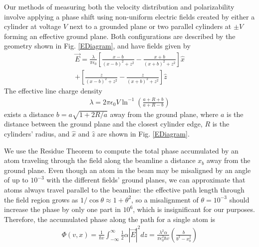 \documentclass[twocolumn,prl,showpacs,superscriptaddress]{revtex4-1}   %
\newcommand{\figref}[1]{Fig. \ref{#1}}
\begin{document}
Our methods of measuring both the velocity distribution and polarizability involve applying a phase shift using non-uniform electric fields created by either a cylinder at voltage $V$ next to a grounded plane or two parallel cylinders at $\pm V$ forming an effective ground plane. 
Both configurations are described by the geometry shown in \figref{EDiagram}, and have fields given by
\begin{align}
	\vec{E} = \frac{\lambda}{\pi\epsilon_0}
	\left[	
		\frac{x-b}{(x-b)^2+z^2} - \frac{x+b}{(x+b)^2+z^2}
	\right] \hat{x} \nonumber \\
	+ 
	\left[	
		\frac{z}{(x-b)^2+z^2} - \frac{z}{(x+b)^2+z^2}
	\right] \hat{z}
	\label{EPillars}
\end{align}
The effective line charge density
\begin{align}
	\lambda = 2\pi\epsilon_0V\ln^{-1}
	\left(
		\frac{a+R+b}{a+R-b}
	\right)
	\label{lambda}
\end{align}
exists a distance $b = a\sqrt{1+2R/a}$ away from the ground plane, where $a$ is the distance between the ground plane and the closest cylinder edge, $R$ is the cylinders' radius, and $\hat{x}$ and $\hat{z}$ are shown in \figref{EDiagram}.

We use the Residue Theorem to compute the total phase accumulated by an atom traveling through the field along the beamline a distance $x_b$ away from the ground plane. Even though an atom in the beam may be misaligned by an angle of up to $10^{-3}$ with the different fields' ground planes, we can approximate that atoms always travel parallel to the beamline: the effective path length through the field region grows as $1/\cos{\theta} \approx 1+\theta^2$, so a misalignment of $\theta = 10^{-3}$ should increase the phase by only one part in $10^6$, which is insignificant for our purposes. Therefore, the accumulated phase along the path for a single atom is
\begin{align}
	\Phi(v,x) = 
	\frac{1}{\hbar v} \int_{-\infty}^{\infty} \frac{1}{2} \alpha |\vec{E}|^2 dz =	
	\frac{\lambda^2 \alpha}{\pi \epsilon_0^2 \hbar v}
	\left( \frac{b}{b^2-x_b^2} \right)
	\label{accumPhasePillars}
\end{align}
\end{document}
